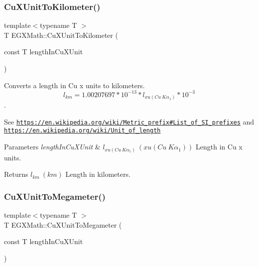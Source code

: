 \subsubsection{\texorpdfstring{Cu\+X\+Unit\+To\+Kilometer()}{CuXUnitToKilometer()}}
{\footnotesize\ttfamily template$<$typename T $>$ \\
T E\+G\+X\+Math\+::\+Cu\+X\+Unit\+To\+Kilometer (\begin{DoxyParamCaption}\item[{const T}]{length\+In\+Cu\+X\+Unit }\end{DoxyParamCaption})}



Converts a length in Cu x units to kilometers. \[ l_{km}=1.00207697*10^{-13} * l_{xu(Cu\ K\alpha_1)} * 10^{-3} \]. 

See \href{https://en.wikipedia.org/wiki/Metric_prefix#List_of_SI_prefixes}{\tt https\+://en.\+wikipedia.\+org/wiki/\+Metric\+\_\+prefix\#\+List\+\_\+of\+\_\+\+S\+I\+\_\+prefixes} and \href{https://en.wikipedia.org/wiki/Unit_of_length}{\tt https\+://en.\+wikipedia.\+org/wiki/\+Unit\+\_\+of\+\_\+length} 
\begin{DoxyParams}{Parameters}
{\em length\+In\+Cu\+X\+Unit} & $ l_{xu(Cu\ K\alpha_1)}\ (xu(Cu\ K\alpha_1))$ Length in Cu x units. \\
\hline
\end{DoxyParams}
\begin{DoxyReturn}{Returns}
$ l_{km}\ (km)$ Length in kilometers. 
\end{DoxyReturn}
\mbox{\label{group___e_g_x_math-_conversions-_length_conversions-_non-_s_i-_cu_x_unit-_s_i_ga78c09f3730329cab2764fc8c488f6274}} 
\subsubsection{\texorpdfstring{Cu\+X\+Unit\+To\+Megameter()}{CuXUnitToMegameter()}}
{\footnotesize\ttfamily template$<$typename T $>$ \\
T E\+G\+X\+Math\+::\+Cu\+X\+Unit\+To\+Megameter (\begin{DoxyParamCaption}\item[{const T}]{length\+In\+Cu\+X\+Unit }\end{DoxyParamCaption})}



